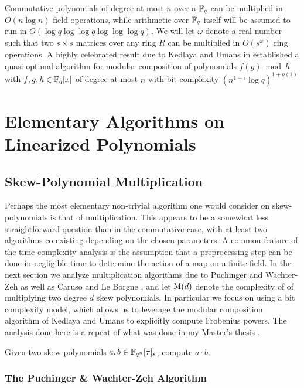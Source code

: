 Commutative polynomials of degree at most $n$ over a $\mathbb{F}_q$ can be multiplied in $O(n\log n)$ field operations, while arithmetic over $\mathbb{F}_q$ itself will be assumed to run in $O(\log q \log \log q \log \log \log q)$. We will let $\omega$ denote a real number such that two $s \times s$ matrices over any ring $R$ can be multiplied in $O(s^{\omega})$ ring operations. A highly celebrated result due to Kedlaya and Umans in \cite{Kedlaya:2011:FPF:2340436.2340448} established a quasi-optimal algorithm for modular composition of polynomials $f(g) \bmod h$ with $f,g,h \in \mathbb{F}_q[x]$ of degree at most $n$ with bit complexity $(n^{1 + \epsilon} \log q)^{1+o(1)}$ 

\section{Elementary Algorithms on Linearized Polynomials}

\subsection{Skew-Polynomial Multiplication}

Perhaps the most elementary non-trivial algorithm one would consider on skew-polynomials is that of multiplication. This appears to be a somewhat less straightforward question than in the commutative case, with at least two algorithms co-existing depending on the chosen parameters. A common feature of the time complexity analysis is the assumption that a preprocessing step can be done in negligible time to determine the action of a map on a finite field. In the next section we analyze multiplication algorithms due to Puchinger and Wachter-Zeh \cite{PUCHINGER2017b} as well as Caruso and Le Borgne \cite{CaLe17}, and let $\textnormal{M}(d)$ denote the complexity of of multiplying two degree $d$ skew polynomials. In particular we focus on using a bit complexity model, which allows us to leverage the modular composition algorithm of Kedlaya and Umans \cite{Kedlaya:2011:FPF:2340436.2340448} to explicitly compute Frobenius powers. The analysis done here is a repeat of what was done in my Master's thesis \cite{Musleh}.

\begin{problem}
Given two skew-polynomials $a, b \in \mathbb{F}_{q^n}[\tau]_s$, compute $a \cdot b$.
\end{problem}

\subsubsection{The Puchinger \& Wachter-Zeh Algorithm}


